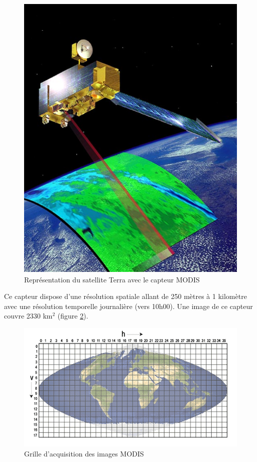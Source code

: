 \documentclass[10pt,a4paper]{article}
\begin{document}
\begin{figure}[!h]
\centering
\includegraphics[scale=0.5]{img/modis.png}
\caption{Représentation du satellite Terra avec le capteur MODIS}
\label{modis}
\end{figure}

Ce capteur dispose d'une résolution spatiale allant de 250 mètres à 1 kilomètre avec une résolution temporelle journalière (vers 10h00). Une image de ce capteur couvre 2330 km$^2$ (figure \ref{modisGrid}).

\begin{figure}[!h]
\centering
\includegraphics[scale=0.7]{img/modisGrid.png}
\caption{Grille d'acquisition des images MODIS}
\label{modisGrid}
\end{figure}
\end{document}
